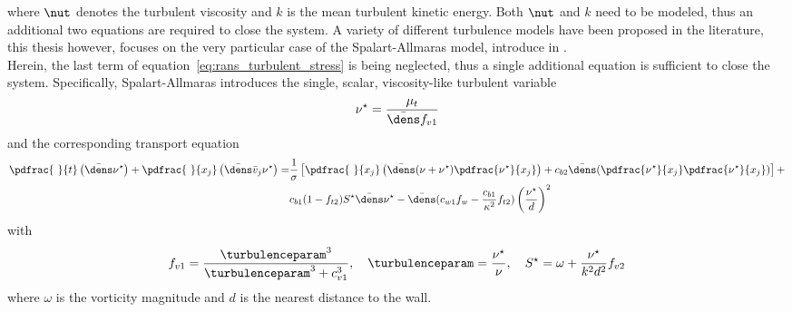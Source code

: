 \documentclass[../main.tex]{subfiles}
\begin{document}
where $\nut$ denotes the turbulent viscosity and $k$ is the mean turbulent kinetic energy. Both $\nut$ and $k$ need to be modeled, thus an additional two equations are required to close the system. A variety of different turbulence models have been proposed in the literature, this thesis however, focuses on the very particular case of the Spalart-Allmaras model, introduce in \cite{Spalart1994}.\\
Herein, the last term of equation~\eqref{eq:rans_turbulent_stress} is being neglected, thus a single additional equation is sufficient to close the system.
Specifically, Spalart-Allmaras introduces the single, scalar, viscosity-like turbulent variable
\begin{align}
\nu^{\star}=\frac{\mu_t}{\bar{\dens} f_{v1}}
\end{align}
and the corresponding transport equation
\begin{align}
\pdfrac{~}{t}\left( \bar{\dens} \nu^{\star}\right) + \pdfrac{~}{x_j}\left( \bar{\dens}\bar{v}_j \nu^{\star} \right) = 
&\frac{1}{\sigma}\left[ \pdfrac{~}{x_j} \left( \bar{\dens}(\nu+\nu^{\star})\pdfrac{\nu^{\star}}{x_j} \right) + c_{b2} \bar{\dens}(\pdfrac{\nu^{\star}}{x_j}\pdfrac{\nu^{\star}}{x_j})\right]+\nonumber\\
&c_{b1}(1-f_{t2}) S^{\star} \bar{\dens}\nu^{\star}-\bar{\dens}(c_{w1}f_{w}-\frac{c_{b1}}{\kappa^2} f_{t2})
\left(\frac{\nu^{\star}}{d}\right)^{2}
\end{align}
with
\begin{align}
f_{v1}=\frac{\turbulenceparam^3}{\turbulenceparam^3+c_{v1}^3},~~~\turbulenceparam=\frac{\nu^{\star}}{\nu},~~~S^{\star}=\omega+\frac{\nu^{\star}}{k^2d^2}f_{v2}
\end{align}
where $\omega$ is the vorticity magnitude and $d$ is the nearest distance to the wall.
\end{document}
